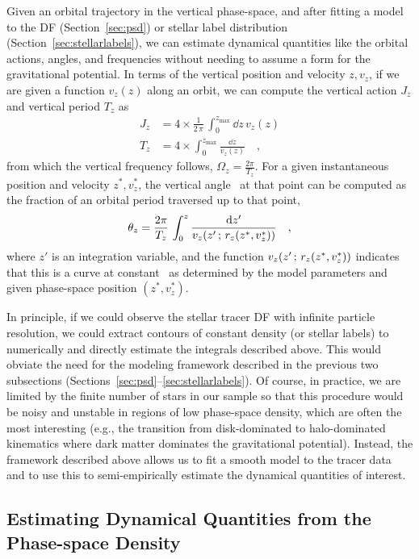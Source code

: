 Given an orbital trajectory in the vertical phase-space, and after fitting a model to
the DF (Section~\ref{sec:psd}) or stellar label distribution
(Section~\ref{sec:stellarlabels}), we can estimate dynamical quantities like the orbital
actions, angles, and frequencies without needing to assume a form for the gravitational
potential.
In terms of the vertical position and velocity $z, v_z$, if we are given a function
$v_z(z)$ along an orbit, we can compute the vertical action $J_z$ and vertical period
$T_z$ as
\begin{align}
    J_z &= 4 \times \frac{1}{2\,\pi} \, \int_0^{z_{\textrm{max}}} \dd z \, v_z(z) \\
    T_z &= 4 \times \int_0^{z_{\textrm{max}}} \frac{\dd z}{v_z(z)}\quad ,
\end{align}
from which the vertical frequency follows, $\Omega_z = \frac{2\pi}{T_z}$.
For a given instantaneous position and velocity $z^*, v_z^*$, the vertical angle
\thz\ at that point can be computed as the fraction of an orbital period traversed
up to that point,
\begin{equation}
    \theta_z = \frac{2\pi}{T_z} \, \int_0^{z} \frac{\mathrm{d} z'}{v_z(z' \,;\, r_z(z^*, v_z^*))} \quad ,
\end{equation}
where $z'$ is an integration variable, and the function $v_z(z' \,;\, r_z(z^*, v_z^*))$
indicates that this is a curve at constant \rz\ as determined by the model parameters
and given phase-space position $(z^*, v_z^*)$.

In principle, if we could observe the stellar tracer DF with infinite particle
resolution, we could extract contours of constant density (or stellar labels) to
numerically and directly estimate the integrals described above.
This would obviate the need for the modeling framework described in the previous two
subsections (Sections~\ref{sec:psd}--\ref{sec:stellarlabels}).
Of course, in practice, we are limited by the finite number of stars in our sample so
that this procedure would be noisy and unstable in regions of low phase-space density,
which are often the most interesting (e.g., the transition from disk-dominated to
halo-dominated kinematics where dark matter dominates the gravitational potential).
Instead, the framework described above allows us to fit a smooth model to the tracer data and to use this to semi-empirically estimate the dynamical quantities of interest.




\subsection{Estimating Dynamical Quantities from the Phase-space Density}

